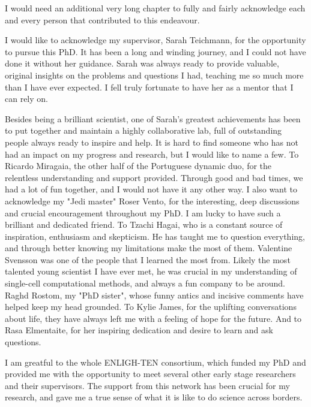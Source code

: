 
\begin{acknowledgements}      


I would need an additional very long chapter to fully and fairly acknowledge each and every person that contributed to this endeavour.

I would like to acknowledge my supervisor, Sarah Teichmann, for the opportunity to pursue this PhD. It has been a long and winding journey, and I could not have done it without her guidance. Sarah was always ready to provide valuable, original insights on the problems and questions I had, teaching me so much more than I have ever expected. I fell truly fortunate to have her as a mentor that I can rely on.

Besides being a brilliant scientist, one of Sarah's greatest achievements has been to put together and maintain a highly collaborative lab, full of outstanding people always ready to inspire and help. It is hard to find someone who has not had an impact on my progress and research, but I would like to name a few. To Ricardo Miragaia, the other half of the Portuguese dynamic duo, for the relentless understanding and support provided. Through good and bad times, we had a lot of fun together, and I would not have it any other way. I also want to acknowledge my "Jedi master" Roser Vento, for the interesting, deep discussions and crucial encouragement throughout my PhD. I am lucky to have such a brilliant and dedicated friend. To Tzachi Hagai, who is a constant source of inspiration, enthusiasm and skepticism. He has taught me to question everything, and through better knowing my limitations make the most of them. Valentine Svensson was one of the people that I learned the most from. Likely the most talented young scientist I have ever met, he was crucial in my understanding of single-cell computational methods, and always a fun company to be around. Raghd Rostom, my "PhD sister", whose funny antics and incisive comments have helped keep my head grounded. To Kylie James, for the uplifting conversations about life, they have always left me with a feeling of hope for the future. And to Rasa Elmentaite, for her inspiring dedication and desire to learn and ask questions.

I am greatful to the whole ENLIGH-TEN consortium, which funded my PhD and provided me with the opportunity to meet several other early stage researchers and their supervisors. The support from this network has been crucial for my research, and gave me a true sense of what it is like to do science across borders.


\end{acknowledgements}

